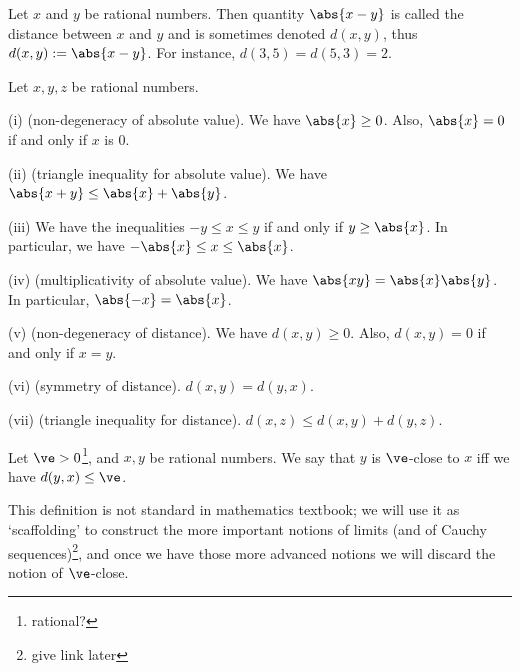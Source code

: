 \begin{definition}
Let $x$ and $y$ be rational numbers. Then quantity $\abs{x-y}$ is called the distance between $x$ and $y$ and is sometimes denoted $d(x,y)$, thus $d(x,y):=\abs{x-y}$. For instance, $d(3,5) = d(5,3) = 2$.
\end{definition}

\begin{proposition}
Let $x,y,z$ be rational numbers.
\ben
\item [(i)] (non-degeneracy of absolute value). We have $\abs{x}\geq 0$. Also, $\abs{x} = 0$ if and only if $x$ is 0.
\item [(ii)] (triangle inequality for absolute value). We have $\abs{x+y} \leq \abs{x} + \abs{y}$.
\item [(iii)] We have the inequalities $-y \leq x\leq y$ if and only if $y\geq \abs{x}$. In particular, we have $-\abs{x}\leq x\leq \abs{x}$.
\item [(iv)] (multiplicativity of absolute value). We have $\abs{xy} = \abs{x}\abs{y}$. In particular, $\abs{-x} = \abs{x}$.
\item [(v)] (non-degeneracy of distance). We have $d(x,y) \geq 0$. Also, $d(x,y) = 0$ if and only if $x=y$.
\item [(vi)] (symmetry of distance). $d(x,y) = d(y,x)$.
\item [(vii)] (triangle inequality for distance). $d(x,z) \leq d(x,y) + d(y,z)$.
\een
\end{proposition}

\begin{definition}[$\ve$-closeness]
Let $\ve >0$\footnote{rational?}, and $x,y$ be rational numbers. We say that $y$ is $\ve$-close to $x$ iff we have $d(y,x) \leq \ve$.
\end{definition}

\begin{remark}
This definition is not standard in mathematics textbook; we will use it as `scaffolding' to construct the more important notions of limits (and of Cauchy sequences)\footnote{give link later}, and once we have those more advanced notions we will discard the notion of $\ve$-close.
\end{remark}

